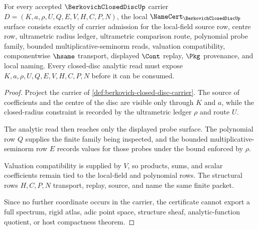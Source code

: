 \begin{theorem}
\label{thm:berkovich-closed-disc-namecert-obligations}
For every accepted $\BerkovichClosedDiscUp$ carrier $D=(K,a,\rho,U,Q,E,V,H,C,P,N)$, the local $\NameCert_{\BerkovichClosedDiscUp}$ surface consists exactly of carrier admission for the local-field source row, centre row, ultrametric radius ledger, ultrametric comparison route, polynomial probe family, bounded multiplicative-seminorm reads, valuation compatibility, componentwise $\hsame$ transport, displayed $\Cont$ replay, $\Pkg$ provenance, and local naming. Every closed-disc analytic read must expose $K,a,\rho,U,Q,E,V,H,C,P,N$ before it can be consumed.
\end{theorem}
\begin{proof}
Project the carrier of \autoref{def:berkovich-closed-disc-carrier}. The source of coefficients and the centre of the disc are visible only through $K$ and $a$, while the closed-radius constraint is recorded by the ultrametric ledger $\rho$ and route $U$.

The analytic read then reaches only the displayed probe surface. The polynomial row $Q$ supplies the finite family being inspected, and the bounded multiplicative-seminorm row $E$ records values for those probes under the bound enforced by $\rho$.

Valuation compatibility is supplied by $V$, so products, sums, and scalar coefficients remain tied to the local-field and polynomial rows. The structural rows $H,C,P,N$ transport, replay, source, and name the same finite packet.

Since no further coordinate occurs in the carrier, the certificate cannot export a full spectrum, rigid atlas, adic point space, structure sheaf, analytic-function quotient, or host compactness theorem.
\end{proof}



